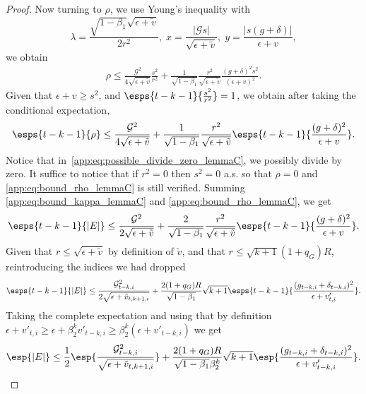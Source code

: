 \documentclass[11pt, letterpaper]{article}
\begin{document}
\begin{proof}
Now turning to $\rho$, we use Young's inequality with $$\lambda = \frac{\sqrt{1- \beta_1}\sqrt{\epsilon+\tilde{v}}}{2
r^2},
\; x = \frac{|\mathcal{G}s|}{\sqrt{\epsilon+\tilde{v}}}, \; y = \frac{|s (g+\delta)|}{\epsilon + v},$$
we obtain
\begin{align}
\label{app:eq:possible_divide_zero_lemmaC}
    \rho \leq \frac{\mathcal{G}^2}{4 \sqrt{\epsilon+\tilde{v}}}\frac{s^2}{r^2} +
    \frac1{\sqrt{1-\beta_1}}\frac{r^2}{\sqrt{\epsilon+\tilde{v}}}\frac{(g+\delta)^2 s^2}{(\epsilon + v)^2}.
\end{align}
Given that $\epsilon + v \geq s^2$, and $\esps{t-k-1}{\frac{s^2}{r^2}} = 1$, we obtain after taking the conditional expectation,
\begin{align}
\label{app:eq:bound_rho_lemmaC}
    \esps{t - k -1}{\rho} \leq \frac{\mathcal{G}^2}{4 \sqrt{\epsilon+\tilde{v}}} + \frac1{\sqrt{1-\beta_1}}\frac{r^2}{\sqrt{\epsilon+\tilde{v}}}\esps{t-k-1}{\frac{(g+\delta)^2}{\epsilon +
    v}}.
\end{align}
Notice that in~\eqref{app:eq:possible_divide_zero_lemmaC}, we possibly divide by zero. It suffice to notice that if $r^2 = 0$ then $s^2 = 0$ a.s. so that $\rho = 0$ and \eqref{app:eq:bound_rho_lemmaC} is still verified.
Summing \eqref{app:eq:bound_kappa_lemmaC} and \eqref{app:eq:bound_rho_lemmaC}, we get
\begin{align}
\label{app:eq:descent_proof:pre_last_lemmaC}
    \esps{t -k - 1}{|E|} \leq \frac{\mathcal{G}^2}{2 \sqrt{\epsilon+\tilde{v}}} + \frac2{\sqrt{1-\beta_1}}\frac{r^2}{\sqrt{\epsilon+\tilde{v}}} \esps{t -k -1}{\frac{(g+\delta)^2}{\epsilon + v}}.
\end{align}
Given that $r \leq \sqrt{\epsilon+\tilde{v}}$ by definition of $\tilde{v}$, and that $r \leq \sqrt{k + 1} (1+q_G)R$, reintroducing the indices we had dropped
\begin{align}
    \esps{t -k - 1}{|E|} \leq \frac{\mathcal{G}_{t - k, i}^2}{2 \sqrt{\epsilon+\tilde{v}_{t, k + 1, i}}} + \frac{2 (1+q_G)R}{\sqrt{1 - \beta_1}} \sqrt{k+1} \esps{t-k-1}{\frac{(g_{t -k, i}+\delta_{t-k,i})^2}{\epsilon + v'_{t, i}}}.
\end{align}
Taking the complete expectation and using that by definition $\epsilon + v'_{t, i} \geq \epsilon + \beta_2^k v'_{t-k, i} \geq \beta_2^k (\epsilon + v'_{t - k, i})$ we get
\begin{align}
\label{app:eq:descent_proof:last_lemmaC}
    \esp{|E|} \leq \frac{1}{2}\esp{\frac{\mathcal{G}_{t - k, i}^2}{\sqrt{\epsilon+\tilde{v}_{t, k+1, i}}}} + \frac{2 (1+q_G)R}{\sqrt{1 - \beta_1}\beta_2^k} \sqrt{k+1} \esp{\frac{(g_{t -k, i}+\delta_{t-k,i})^2}{\epsilon + v'_{t - k, i}}}.

\end{align}
\end{proof}
\end{document}

